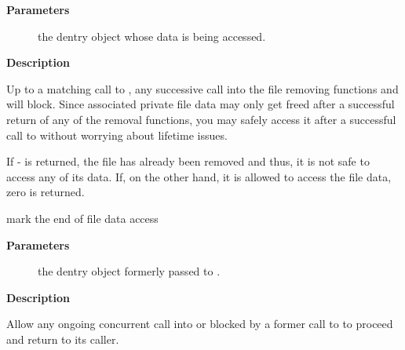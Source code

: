 \documentclass[a4paper,8pt,english]{sphinxmanual}
\begin{document}
\textbf{Parameters}
\begin{description}
\item[{}] \leavevmode
the dentry object whose data is being accessed.

\end{description}

\textbf{Description}

Up to a matching call to {\hyperref[filesystems/index:c.debugfs_file_put]{\emph{}}}, any successive call
into the file removing functions {\hyperref[filesystems/index:c.debugfs_remove]{\emph{}}} and
{\hyperref[filesystems/index:c.debugfs_remove_recursive]{\emph{}}} will block. Since associated private
file data may only get freed after a successful return of any of
the removal functions, you may safely access it after a successful
call to {\hyperref[filesystems/index:c.debugfs_file_get]{\emph{}}} without worrying about lifetime issues.

If - is returned, the file has already been removed and thus,
it is not safe to access any of its data. If, on the other hand,
it is allowed to access the file data, zero is returned.

\begin{fulllineitems}
\label{filesystems/index:c.debugfs_file_put}
mark the end of file data access

\end{fulllineitems}


\textbf{Parameters}
\begin{description}
\item[{}] \leavevmode
the dentry object formerly passed to
{\hyperref[filesystems/index:c.debugfs_file_get]{\emph{}}}.

\end{description}

\textbf{Description}

Allow any ongoing concurrent call into {\hyperref[filesystems/index:c.debugfs_remove]{\emph{}}} or
{\hyperref[filesystems/index:c.debugfs_remove_recursive]{\emph{}}} blocked by a former call to
{\hyperref[filesystems/index:c.debugfs_file_get]{\emph{}}} to proceed and return to its caller.
\end{document}

